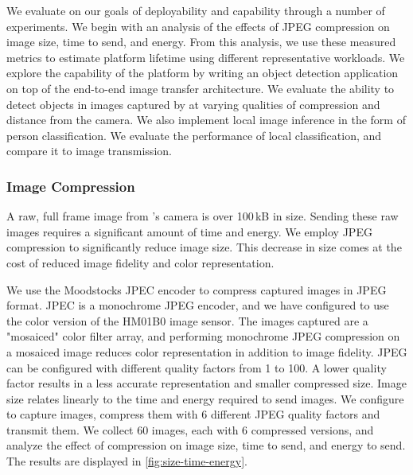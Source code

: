 We evaluate \name{} on our goals of deployability and capability through a number of experiments. We begin with an analysis of the effects of JPEG compression on image size, time to send, and energy. From this analysis, we use these measured metrics to estimate platform lifetime using different representative workloads. 
We explore the capability of the platform by writing an object detection application on top of the \name{} end-to-end image transfer architecture. We evaluate the ability to detect objects in images captured by \name{} at varying qualities of compression and distance from the camera. We also implement local image inference in the form of person classification. We evaluate the performance of local classification, and compare it to image transmission.


\subsubsection{Image Compression}
\label{eval:compression}
A raw, full frame image from \name{}'s camera is over 100\,kB in size. Sending these raw images requires a significant amount of time and energy. We employ JPEG compression to significantly reduce image size. This decrease in size comes at the cost of reduced image fidelity and color representation.

We use the Moodstocks JPEC encoder to compress captured images in JPEG format. JPEC is a monochrome JPEG encoder, and we have configured \name{} to use the color version of the HM01B0 image sensor. The images captured are a "mosaiced" color filter array, and performing monochrome JPEG compression on a mosaiced image reduces color representation in addition to image fidelity. JPEG can be configured with different quality factors from 1 to 100. A lower quality factor results in a less accurate representation and smaller compressed size. Image size relates linearly to the time and energy required to send images. 
We configure \name to capture images, compress them with 6 different JPEG quality factors and transmit them. We collect 60 images, each with 6 compressed versions, and analyze the effect of compression on image size, time to send, and energy to send.
The results are displayed in \cref{fig:size-time-energy}. 

